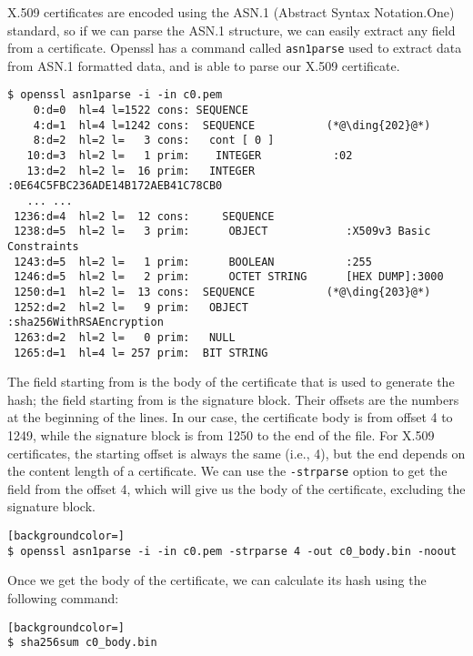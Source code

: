 X.509 certificates are encoded using the ASN.1 (Abstract Syntax Notation.One) standard,
so if we can parse the ASN.1 structure, we can easily extract any field from a certificate.
Openssl has a command called \texttt{asn1parse} used to extract data from ASN.1 formatted data,
and is able to parse our X.509 certificate.


\begin{lstlisting}
$ openssl asn1parse -i -in c0.pem
    0:d=0  hl=4 l=1522 cons: SEQUENCE
    4:d=1  hl=4 l=1242 cons:  SEQUENCE           (*@\ding{202}@*)
    8:d=2  hl=2 l=   3 cons:   cont [ 0 ]
   10:d=3  hl=2 l=   1 prim:    INTEGER           :02
   13:d=2  hl=2 l=  16 prim:   INTEGER           :0E64C5FBC236ADE14B172AEB41C78CB0
   ... ...
 1236:d=4  hl=2 l=  12 cons:     SEQUENCE
 1238:d=5  hl=2 l=   3 prim:      OBJECT            :X509v3 Basic Constraints
 1243:d=5  hl=2 l=   1 prim:      BOOLEAN           :255
 1246:d=5  hl=2 l=   2 prim:      OCTET STRING      [HEX DUMP]:3000
 1250:d=1  hl=2 l=  13 cons:  SEQUENCE           (*@\ding{203}@*)
 1252:d=2  hl=2 l=   9 prim:   OBJECT            :sha256WithRSAEncryption
 1263:d=2  hl=2 l=   0 prim:   NULL
 1265:d=1  hl=4 l= 257 prim:  BIT STRING
\end{lstlisting}


The field starting from  is the body of the certificate that is used to generate the hash; the
field starting from  is the signature block. Their offsets are the numbers at the beginning
of the lines. In our case, the certificate body is from offset 4 to 1249, while the
signature block is from 1250 to the end of the file. For X.509 certificates, the starting
offset is always the same (i.e., 4), but the end depends on the content length of a
certificate.  We can use the
\texttt{-strparse} option to get the field from the offset 4, which will give us the body of
the certificate, excluding the signature block.

\begin{lstlisting}[backgroundcolor=]
$ openssl asn1parse -i -in c0.pem -strparse 4 -out c0_body.bin -noout
\end{lstlisting}

Once we get the body of the certificate, we can calculate its hash using the following
command:

\begin{lstlisting}[backgroundcolor=]
$ sha256sum c0_body.bin
\end{lstlisting}



